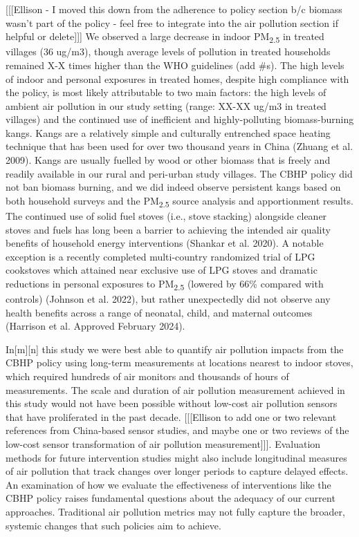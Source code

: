 \documentclass[
  letterpaper,
  DIV=11,
  numbers=noendperiod]{scrartcl}
\begin{document}
{[}{[}{[}Ellison - I moved this down from the adherence to policy
section b/c biomass wasn't part of the policy - feel free to integrate
into the air pollution section if helpful or delete{]}{]}{]} We observed
a large decrease in indoor PM\textsubscript{2.5} in treated villages (36
ug/m3), though average levels of pollution in treated households
remained X-X times higher than the WHO guidelines (add \#s). The high
levels of indoor and personal exposures in treated homes, despite high
compliance with the policy, is most likely attributable to two main
factors: the high levels of ambient air pollution in our study setting
(range: XX-XX ug/m3 in treated villages) and the continued use of
inefficient and highly-polluting biomass-burning kangs. Kangs are a
relatively simple and culturally entrenched space heating technique that
has been used for over two thousand years in China (Zhuang et al. 2009).
Kangs are usually fuelled by wood or other biomass that is freely and
readily available in our rural and peri-urban study villages. The CBHP
policy did not ban biomass burning, and we did indeed observe persistent
kangs based on both household surveys and the PM\textsubscript{2.5}
source analysis and apportionment results. The continued use of solid
fuel stoves (i.e., stove stacking) alongside cleaner stoves and fuels
has long been a barrier to achieving the intended air quality benefits
of household energy interventions (Shankar et al. 2020). A notable
exception is a recently completed multi-country randomized trial of LPG
cookstoves which attained near exclusive use of LPG stoves and dramatic
reductions in personal exposures to PM\textsubscript{2.5} (lowered by
66\% compared with controls) (Johnson et al. 2022), but rather
unexpectedly did not observe any health benefits across a range of
neonatal, child, and maternal outcomes (Harrison et al. Approved
February 2024).

In{[}m{]}{[}n{]} this study we were best able to quantify air pollution
impacts from the CBHP policy using long-term measurements at locations
nearest to indoor stoves, which required hundreds of air monitors and
thousands of hours of measurements. The scale and duration of air
pollution measurement achieved in this study would not have been
possible without low-cost air pollution sensors that have proliferated
in the past decade. {[}{[}{[}Ellison to add one or two relevant
references from China-based sensor studies, and maybe one or two reviews
of the low-cost sensor transformation of air pollution
measurement{]}{]}{]}. Evaluation methods for future intervention studies
might also include longitudinal measures of air pollution that track
changes over longer periods to capture delayed effects. An examination
of how we evaluate the effectiveness of interventions like the CBHP
policy raises fundamental questions about the adequacy of our current
approaches. Traditional air pollution metrics may not fully capture the
broader, systemic changes that such policies aim to achieve.
\end{document}
